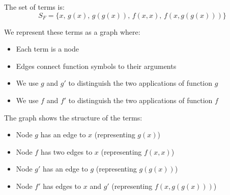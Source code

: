 \documentclass[11pt,a4paper]{article}
\theoremstyle{definition}
\theoremstyle{plain}
\theoremstyle{remark}
\begin{document}
The set of terms is:
\[
S_F = \{x, \, g(x), \, g(g(x)), \, f(x, x), \, f(x, g(g(x)))\}
\]

We represent these terms as a graph where:
\begin{itemize}
    \item Each term is a node
    \item Edges connect function symbols to their arguments
    \item We use $g$ and $g'$ to distinguish the two applications of function $g$
    \item We use $f$ and $f'$ to distinguish the two applications of function $f$
\end{itemize}

\begin{center}
\end{center}

The graph shows the structure of the terms:
\begin{itemize}
    \item Node $g$ has an edge to $x$ (representing $g(x)$)
    \item Node $f$ has two edges to $x$ (representing $f(x,x)$)
    \item Node $g'$ has an edge to $g$ (representing $g(g(x))$)
    \item Node $f'$ has edges to $x$ and $g'$ (representing $f(x, g(g(x)))$)
\end{itemize}
\end{document}
